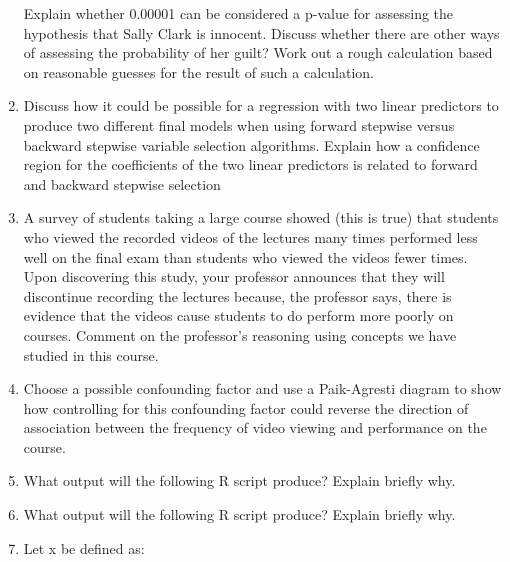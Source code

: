 \documentclass[
]{article}
\begin{document}
\begin{enumerate}
  Explain whether 0.00001 can be considered a p-value for assessing the
  hypothesis that Sally Clark is innocent. Discuss whether there are
  other ways of assessing the probability of her guilt? Work out a rough
  calculation based on reasonable guesses for the result of such a
  calculation. \vspace{0px}
\item
  Discuss how it could be possible for a regression with two linear
  predictors to produce two different final models when using forward
  stepwise versus backward stepwise variable selection algorithms.
  Explain how a confidence region for the coefficients of the two linear
  predictors is related to forward and backward stepwise selection
  \vspace{0px}
\item
  A survey of students taking a large course showed (this is true) that
  students who viewed the recorded videos of the lectures many times
  performed less well on the final exam than students who viewed the
  videos fewer times. Upon discovering this study, your professor
  announces that they will discontinue recording the lectures because,
  the professor says, there is evidence that the videos cause students
  to do perform more poorly on courses. Comment on the professor's
  reasoning using concepts we have studied in this course. \vspace{0px}
\item
  Choose a possible confounding factor and use a Paik-Agresti diagram to
  show how controlling for this confounding factor could reverse the
  direction of association between the frequency of video viewing and
  performance on the course. \vspace{0px}
\item
  What output will the following R script produce? Explain briefly why.

  \vspace{0px}
\item
  What output will the following R script produce? Explain briefly why.

  \vspace{0px}
\item
  Let x be defined as:


\end{enumerate}
\end{document}
